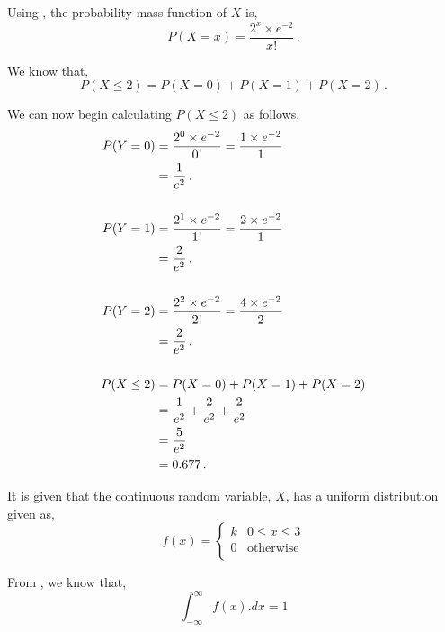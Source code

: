 \begin{subquestions}
Using , the probability mass function of $X$ is,
\begin{equation}
	P(X=x)= \frac{2^x \times e^{-2}}{x!} \,.
\end{equation}

We know that,
\begin{equation}
	P(X \leq 2) = P(X=0)+P(X=1)+P(X=2) \,.
\end{equation}

We can now begin calculating $P(X \leq 2)$ as follows,
\begin{align}
	P(Y=0) & = \frac{2^0 \times e^{-2}}{0!} 
             = \frac{1 \times e^{-2}}{1} \nonumber \\
	       & = \frac{1}{e^2} \,. \\	\nonumber \\
	P(Y=1) & = \frac{2^1 \times e^{-2}}{1!} 
	         = \frac{2 \times e^{-2}}{1} \nonumber \\
	       & = \frac{2}{e^2} \,. \\	\nonumber \\       
	P(Y=2) & = \frac{2^2 \times e^{-2}}{2!} 
	         = \frac{4 \times e^{-2}}{2} \nonumber \\
	       & = \frac{2}{e^2} \,. \\ \nonumber \\     
	P(X \leq 2) & = P(X=0)+P(X=1)+P(X=2) \nonumber \\
	            & = \frac{1}{e^2} + \frac{2}{e^2} + \frac{2}{e^2} \nonumber \\
	            & = \frac{5}{e^2} \nonumber \\
	            & = 0.677 \,. 
\end{align}


\subquestion

It is given that the continuous random variable, $X$, has a uniform distribution given as,
\[
f(x) =
\begin{cases}
	k & \text{$0 \leq x \leq 3$} \\
	0    & \text{otherwise} \\
\end{cases}
\]

\begin{subsubquestions}
	
\subsubquestion

From , we know that,
\begin{equation}
	\int_{-\infty}^{\infty} f(x).dx = 1
\end{equation}


\end{subsubquestions}
\end{subquestions}
